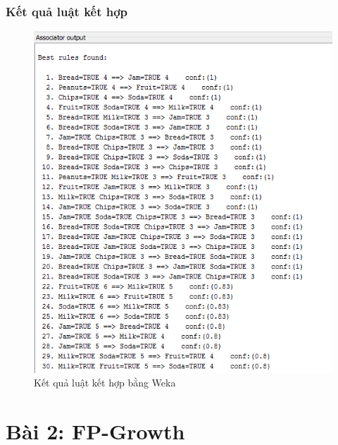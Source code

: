 \documentclass{article}
\begin{document}
\subsubsection{Kết quả luật kết hợp}
\begin{figure}[H]
	\centering
	\caption{Kết quả luật kết hợp bằng Weka}
	\includegraphics[scale = 0.7]{Rule}
\end{figure}
\section{Bài 2: FP-Growth}\label{sec: prob2}
\end{document}
